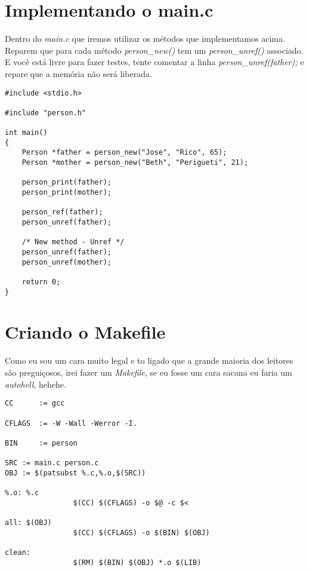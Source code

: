 \section{Implementando o main.c}

Dentro do \textit{main.c} que iremos utilizar os métodos que implementamos acima. Reparem que para cada método \textit{person\_new()} tem um \textit{person\_unref()} associado. 
E você está livre para fazer testes, tente comentar a linha \textit{person\_unref(father);} e repare que a memória não será liberada.

\belowcaptionskip=-10pt
\begin{lstlisting}[label=some-code,caption=main.c]
#include <stdio.h>

#include "person.h"

int main()
{
    Person *father = person_new("Jose", "Rico", 65);
    Person *mother = person_new("Beth", "Perigueti", 21);

    person_print(father);
    person_print(mother);

    person_ref(father);
    person_unref(father);

    /* New method - Unref */
    person_unref(father);
    person_unref(mother);

    return 0;
}
\end{lstlisting}


\section{Criando o Makefile}

Como eu sou um cara muito legal e to ligado que a grande maioria dos leitores são preguiçosos, irei fazer um \textit{Makefile}, se eu fosse um cara sacana eu faria um \textit{autohell}, 
hehehe.

\belowcaptionskip=-10pt
\begin{lstlisting}[label=some-code,caption=Makefile]
CC      := gcc

CFLAGS  := -W -Wall -Werror -I.

BIN     := person

SRC := main.c person.c
OBJ := $(patsubst %.c,%.o,$(SRC))

%.o: %.c
                $(CC) $(CFLAGS) -o $@ -c $<

all: $(OBJ)
                $(CC) $(CFLAGS) -o $(BIN) $(OBJ)

clean:
                $(RM) $(BIN) $(OBJ) *.o $(LIB)
\end{lstlisting}

